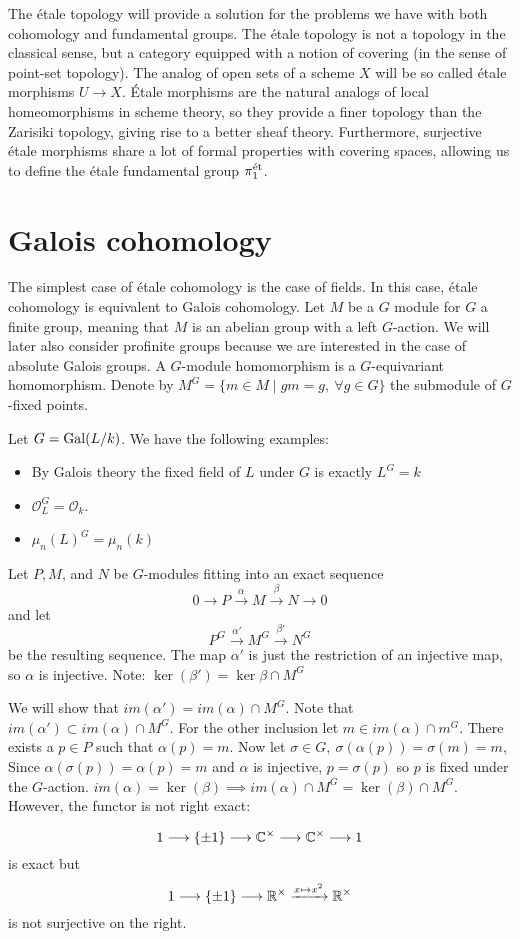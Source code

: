 The \'etale topology will provide a solution for the problems we have with both cohomology and fundamental groups. The \'etale topology is not a topology in the classical sense, but a category equipped with a notion of covering (in the sense of point-set topology). The analog of open sets of a scheme $X$ will be so called \'etale morphisms $U \to X$. \'Etale morphisms are the natural analogs of local homeomorphisms in scheme theory, so they provide a finer topology than the Zarisiki topology, giving rise to a better sheaf theory. Furthermore, surjective \'etale morphisms share a lot of formal properties with covering spaces, allowing us to define the \'etale fundamental group $\pi_1^{\text{\'et}}$.
\section{Galois cohomology}
The simplest case of \'etale cohomology is the case of fields. In this case, \'etale cohomology is equivalent to Galois cohomology.
Let $M$ be a $G$ module for $G$ a finite group, meaning that $M$ is an abelian group with a left $G$-action. We will later also consider profinite groups because we are interested in the case of absolute Galois groups. A $G$-module homomorphism is a $G$-equivariant homomorphism. Denote by $M^G = \{m \in M \mid gm = g, \ \forall g \in G\}$ the submodule of $G$-fixed points.
\begin{example}
	Let $G = \operatorname{Gal}(L/k)$. We have the following examples:
	\begin{itemize}
		\item By Galois theory the fixed field of $L$ under $G$ is exactly $L^G = k$
		\item $\mathcal{O}_L^G = \mathcal{O}_k$.
		\item $\mu_n(L)^G = \mu_n(k)$
	\end{itemize}
\end{example}

Let $P, M$, and $N$ be $G$-modules fitting into an exact sequence
\[
	0 \to P \xrightarrow{\alpha} M \xrightarrow{\beta} N \to 0
\]
and let
\[
	P^G \xrightarrow{\alpha'} M^G \xrightarrow{\beta'} N^G
\]
be the resulting sequence. The map $\alpha'$ is just the restriction of an injective map, so $\alpha$ is injective.
Note:
$\ker(\beta') = \ker \beta \cap M^G$

We will show that $im(\alpha') = im(\alpha) \cap M^G$.
Note that $im(\alpha') \subset im(\alpha) \cap M^G$.
For the other inclusion let $m \in im(\alpha) \cap m^G$. There exists a $p \in P$ such that $\alpha(p)=m$. Now let $\sigma \in G,\ \sigma(\alpha(p)) = \sigma(m) = m$,
Since $\alpha(\sigma(p)) = \alpha(p) = m$ and $\alpha$ is injective, $p = \sigma(p)$ so $p$ is fixed under the $G$-action. $im(\alpha) = \ker(\beta) \implies im(\alpha) \cap M^G = \ker(\beta) \cap M^G$.
However, the functor is not right exact:
\begin{example}
	\[1 \longrightarrow \{\pm 1\} \longrightarrow \mathbb{C}^\times \longrightarrow \mathbb{C}^\times \longrightarrow 1\]
	is exact but
	\[1 \longrightarrow\{\pm 1\} \longrightarrow \mathbb{R}^\times \xrightarrow{x \mapsto x^2} \mathbb{R}^\times\]
	is not surjective on the right.
\end{example}

